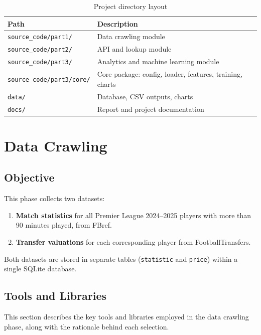 \documentclass[a4paper,12pt]{report}
\begin{document}
\begin{table}[H]
\centering
\caption{Project directory layout}
\label{tab:project_structure}
\begin{tabularx}{\textwidth}{l X}
\toprule
\textbf{Path} & \textbf{Description} \\
\midrule
\texttt{source\_code/part1/} & Data crawling module \\
\texttt{source\_code/part2/} & API and lookup module \\
\texttt{source\_code/part3/} & Analytics and machine learning module \\
\texttt{source\_code/part3/core/} & Core package: config, loader, features, training, charts \\
\texttt{data/} & Database, CSV outputs, charts \\
\texttt{docs/} & Report and project documentation \\
\bottomrule
\end{tabularx}
\end{table}


\chapter{Data Crawling}

\section{Objective}

This phase collects two datasets:
\begin{enumerate}
    \item \textbf{Match statistics} for all Premier League 2024--2025 players with more than 90 minutes played, from FBref.
    \item \textbf{Transfer valuations} for each corresponding player from FootballTransfers.
\end{enumerate}

Both datasets are stored in separate tables (\texttt{statistic} and \texttt{price}) within a single SQLite database.

\section{Tools and Libraries}

This section describes the key tools and libraries employed in the data crawling phase, along with the rationale behind each selection.
\end{document}

